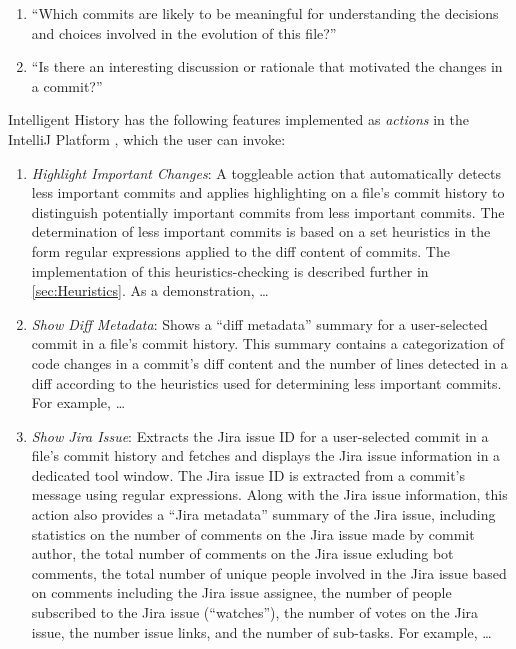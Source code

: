\begin{enumerate}[label={(\arabic*)}]
    \item ``Which commits are likely to be meaningful for understanding the decisions and choices involved in the evolution of this file?''
    \item ``Is there an interesting discussion or rationale that motivated the changes in a commit?''
\end{enumerate}

Intelligent History has the following features implemented as \emph{actions} in the IntelliJ Platform , which the user can invoke:

\begin{enumerate}[label=(\Alph*)]
    \item \textit{Highlight Important Changes}: A toggleable action that automatically detects less important commits and applies highlighting on a file's commit history to distinguish potentially important commits from less important commits. The determination of less important commits is based on a set heuristics in the form regular expressions applied to the diff content of commits. The implementation of this heuristics-checking is described further in \autoref{sec:Heuristics}. As a demonstration, \dots {}
    \item \textit{Show Diff Metadata}: Shows a ``diff metadata'' summary for a user-selected commit in a file's commit history. This summary contains a categorization of code changes in a commit's diff content and the number of lines detected in a diff according to the heuristics used for determining less important commits. For example, \dots {}
    \item \textit{Show Jira Issue}: Extracts the Jira issue ID for a user-selected commit in a file's commit history and fetches and displays the Jira issue information in a dedicated tool window. The Jira issue ID is extracted from a commit's message using regular expressions. Along with the Jira issue information, this action also provides a ``Jira metadata'' summary of the Jira issue, including statistics on the number of comments on the Jira issue made by commit author, the total number of comments on the Jira issue exluding bot comments, the total number of unique people involved in the Jira issue based on comments including the Jira issue assignee, the number of people subscribed to the Jira issue (``watches''), the number of votes on the Jira issue, the number issue links, and the number of sub-tasks. For example, \dots {}
\end{enumerate}

